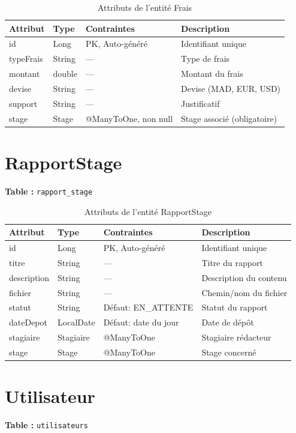 \documentclass[12pt,a4paper]{report}
\begin{document}
\begin{table}[H]
\centering
\begin{tabular}{|l|l|l|p{5cm}|}
\hline
\textbf{Attribut} & \textbf{Type} & \textbf{Contraintes} & \textbf{Description} \\ \hline
id & Long & PK, Auto-généré & Identifiant unique \\ \hline
typeFrais & String & --- & Type de frais \\ \hline
montant & double & --- & Montant du frais \\ \hline
devise & String & --- & Devise (MAD, EUR, USD) \\ \hline
support & String & --- & Justificatif \\ \hline
stage & Stage & @ManyToOne, non null & Stage associé (obligatoire) \\ \hline
\end{tabular}
\caption{Attributs de l'entité Frais}
\end{table}

\section{RapportStage}
\textbf{Table :} \texttt{rapport\_stage}

\begin{table}[H]
\centering
\begin{tabular}{|l|l|l|p{5cm}|}
\hline
\textbf{Attribut} & \textbf{Type} & \textbf{Contraintes} & \textbf{Description} \\ \hline
id & Long & PK, Auto-généré & Identifiant unique \\ \hline
titre & String & --- & Titre du rapport \\ \hline
description & String & --- & Description du contenu \\ \hline
fichier & String & --- & Chemin/nom du fichier \\ \hline
statut & String & Défaut: EN\_ATTENTE & Statut du rapport \\ \hline
dateDepot & LocalDate & Défaut: date du jour & Date de dépôt \\ \hline
stagiaire & Stagiaire & @ManyToOne & Stagiaire rédacteur \\ \hline
stage & Stage & @ManyToOne & Stage concerné \\ \hline
\end{tabular}
\caption{Attributs de l'entité RapportStage}
\end{table}

\section{Utilisateur}
\textbf{Table :} \texttt{utilisateurs}
\end{document}
